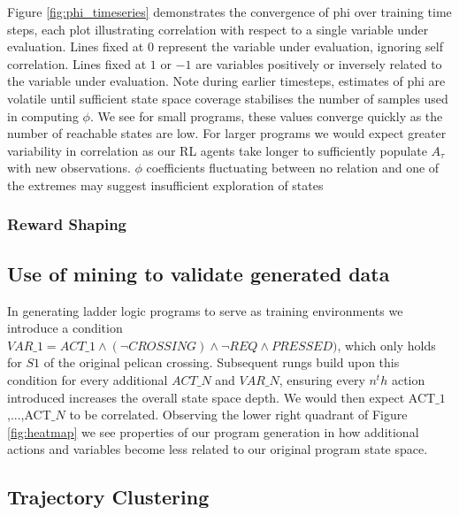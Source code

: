\documentclass[runningheads]{llncs}
\begin{document}

Figure \ref{fig:phi_timeseries} demonstrates the convergence of phi over training time steps, each plot illustrating correlation with respect to a single variable under evaluation. Lines fixed at $0$ represent the variable under evaluation, ignoring self correlation. Lines fixed at $1$ or $-1$ are variables positively or inversely related to the variable under evaluation. Note during earlier timesteps, estimates of phi are volatile until sufficient state space coverage stabilises the number of samples used in computing $\phi$. We see for small programs, these values converge quickly as the number of reachable states are low. For larger programs we would expect greater variability in correlation as our RL agents take longer to sufficiently populate $A_\tau$ with new observations. $\phi$ coefficients fluctuating between no relation and one of the extremes may suggest insufficient exploration of states 


\subsubsection{Reward Shaping}

\subsection{Use of mining to validate generated data}
In generating ladder logic programs to serve as training environments we introduce a condition $VAR\_1 = ACT\_1 \land (\lnot CROSSING) \land \lnot REQ \land PRESSED)$, which only holds for $S1$ of the original pelican crossing. Subsequent rungs build upon this condition for every additional $ACT\_N$ and $VAR\_N$, ensuring every $n^th$ action introduced increases the overall state space depth. We would then expect ACT$\_1$,...,ACT$\_N$ to be correlated.  
Observing the lower right quadrant of Figure \ref{fig:heatmap} we see properties of our program generation in how additional actions and variables become less related to our original program state space.   

\subsection{Trajectory Clustering}
\end{document}
